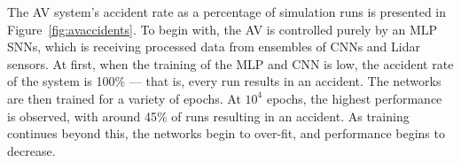 







The \ac{AV} system's accident rate as a percentage of simulation runs is presented in Figure~\ref{fig:avaccidents}.
To begin with, the \ac{AV} is controlled purely by an \ac{MLP} \acp{SNN}, which is receiving processed data from ensembles of \acp{CNN} and Lidar sensors.
At first, when the training of the \ac{MLP} and \ac{CNN} is low, the accident rate of the system is 100\% --- that is, every run results in an accident.
The networks are then trained for a variety of epochs.
At $10^4$ epochs, the highest performance is observed, with around 45\% of runs resulting in an accident.
As training continues beyond this, the networks begin to over-fit, and performance begins to decrease. 


